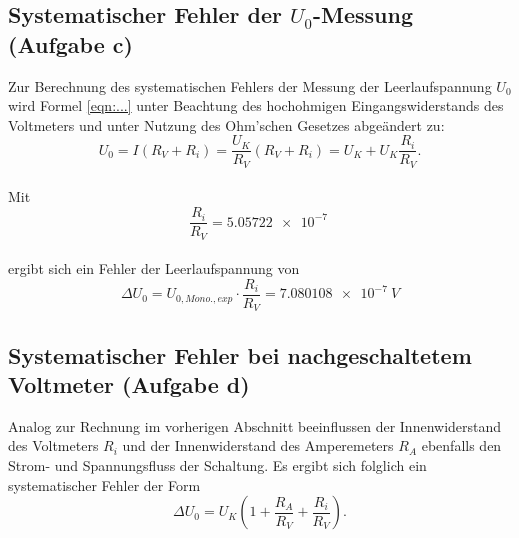 \subsection{Systematischer Fehler der $U_{0}$-Messung (Aufgabe c)}
Zur Berechnung des systematischen Fehlers der Messung der Leerlaufspannung $U_{0}$ wird Formel \eqref{eqn:...} unter Beachtung des hochohmigen Eingangswiderstands des Voltmeters und unter Nutzung des Ohm'schen Gesetzes abgeändert zu:
\begin{equation}
U_{0} = I \left(R_{V}+R_{i} \right)
      = \frac{U_{K}}{R_{V}} \left( R_{V}+R_{i} \right)
      = U_{K}+U_{K} \frac{R_{i}}{R_{V}}.
\end{equation}
\\Mit
\begin{equation*}
  \frac{R_{i}}{R_{V}}=\SI{5.05722e-7}{}
\end{equation*}
\\ergibt sich ein Fehler der Leerlaufspannung von
\begin{equation*}
  \Delta U_{0}= U_{0, Mono., exp} \cdot \frac{R_{i}}{R_{V}} = \SI{7.080108e-7}{V}
\end{equation*}
\FloatBarrier

\subsection{Systematischer Fehler bei nachgeschaltetem Voltmeter (Aufgabe d)}
Analog zur Rechnung im vorherigen Abschnitt beeinflussen der Innenwiderstand des Voltmeters $R_{i}$ und der Innenwiderstand des Amperemeters $R_{A}$ ebenfalls den Strom- und Spannungsfluss der Schaltung.
Es ergibt sich folglich ein systematischer Fehler der Form
\begin{equation*}
  \Delta U_{0}=U_{K} \left( 1+ \frac{R_{A}}{R_{V}} + \frac{R_{i}}{R_{V}} \right).
\end{equation*}
\FloatBarrier

